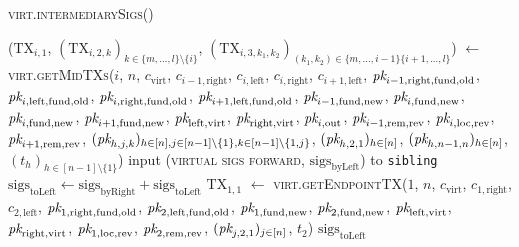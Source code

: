 \begin{center}
  \begin{processbox}{\textsc{virt.intermediarySigs}()}
    \begin{algorithmic}[1]
      \State ($\mathrm{TX}_{i, 1}$, $(\mathrm{TX}_{i, 2, k})_{k \in \{m, \dots,
      l\} \setminus \{i\}}$, $(\mathrm{TX}_{i, 3, k_1, k_2})_{(k_1, k_2) \in
      \{m, \dots, i-1\} \{i+1, \dots, l\}}$) $\gets$
      \textsc{virt.getMidTXs}($i$, $n$, $c_{\mathrm{virt}}$, $c_{i-1,
      \mathrm{right}}$, $c_{i, \mathrm{left}}$, $c_{i, \mathrm{right}}$,
      $c_{i+1, \mathrm{left}}$, $\textit{pk}_{i-1, \mathrm{right}, \mathrm{fund},
      \mathrm{old}}$, $\textit{pk}_{i, \mathrm{left}, \mathrm{fund}, \mathrm{old}}$,
      $\textit{pk}_{i, \mathrm{right}, \mathrm{fund}, \mathrm{old}}$, $\textit{pk}_{i+1,
      \mathrm{left}, \mathrm{fund}, \mathrm{old}}$, $\textit{pk}_{i-1, \mathrm{fund},
      \mathrm{new}}$, $\textit{pk}_{i, \mathrm{fund}, \mathrm{new}}$, $\textit{pk}_{i,
      \mathrm{fund}, \mathrm{new}}$, $\textit{pk}_{i+1, \mathrm{fund}, \mathrm{new}}$,
      $\textit{pk}_{\mathrm{left}, \mathrm{virt}}$, $\textit{pk}_{\mathrm{right}, \mathrm{virt}}$,
      $\textit{pk}_{i, \mathrm{out}}$, $\textit{pk}_{i-1, \mathrm{rem}, \mathrm{rev}}$, $\textit{pk}_{i,
      \mathrm{loc}, \mathrm{rev}}$, $\textit{pk}_{i+1, \mathrm{rem}, \mathrm{rev}}$,
      $(\textit{pk}_{h,j,k})_{h \in [n], j \in [n-1] \setminus \{1\}, k \in [n-1]
      \setminus \{1, j\}}$, $(\textit{pk}_{h, 2, 1})_{h \in [n]}$, $(\textit{pk}_{h, n-1, n})_{h
      \in [n]}$, $(t_h)_{h \in [n-1] \setminus \{1\}}$)
      \State {}
      \State input (\textsc{virtual sigs forward},
      $\mathrm{sigs}_{\mathrm{byLeft}}$) to \texttt{sibling}
      \State {}
      \State $\mathrm{sigs}_{\mathrm{toLeft}} \gets
      \mathrm{sigs}_{\mathrm{byRight}} + \mathrm{sigs}_{\mathrm{toLeft}}$
       
        \State $\mathrm{TX}_{1, 1}$ $\gets$ \textsc{virt.getEndpointTX}($1$,
        $n$, $c_{\mathrm{virt}}$, $c_{1, \mathrm{right}}$, $c_{2,
        \mathrm{left}}$, $\textit{pk}_{1, \mathrm{right}, \mathrm{fund}, \mathrm{old}}$,
        $\textit{pk}_{2, \mathrm{left}, \mathrm{fund}, \mathrm{old}}$, $\textit{pk}_{1,
        \mathrm{fund}, \mathrm{new}}$, $\textit{pk}_{2, \mathrm{fund}, \mathrm{new}}$,
        $\textit{pk}_{\mathrm{left}, \mathrm{virt}}$, $\textit{pk}_{\mathrm{right},
        \mathrm{virt}}$, $\textit{pk}_{1, \mathrm{loc}, \mathrm{rev}}$, $\textit{pk}_{2,
        \mathrm{rem}, \mathrm{rev}}$, $(\textit{pk}_{j, 2, 1})_{j \in [n]}$, $t_2$)
      \EndIf
      \State \Return $\mathrm{sigs}_{\mathrm{toLeft}}$
    \end{algorithmic}
  \end{processbox}
  \label{code:virtual-layer:intermediary-sigs}
\end{center} \ \\

